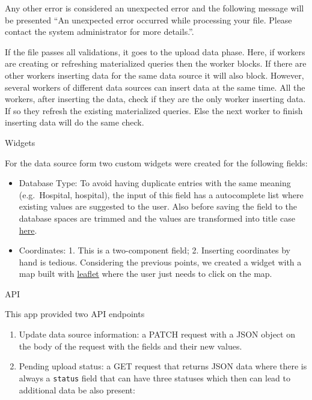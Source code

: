 \documentclass[
]{book}
\providecommand{\tightlist}{%
  \setlength{\itemsep}{0pt}\setlength{\parskip}{0pt}}
\begin{document}
Any other error is considered an unexpected error and the following message will be presented ``An unexpected error occurred while processing your file. Please contact the system administrator for more details.''.

If the file passes all validations, it goes to the upload data phase.
Here, if workers are creating or refreshing materialized queries then the worker blocks.
If there are other workers inserting data for the same data source it will also block.
However, several workers of different data sources can insert data at the same time.
All the workers, after inserting the data, check if they are the only worker inserting data. If so they refresh the existing materialized queries.
Else the next worker to finish inserting data will do the same check.

Widgets

For the data source form two custom widgets were created for the following fields:

\begin{itemize}
\tightlist
\item
  Database Type: To avoid having duplicate entries with the same meaning (e.g.~Hospital, hospital), the input of this field has a autocomplete list where existing values are suggested to the user.
  Also before saving the field to the database spaces are trimmed and the values are transformed into title case \href{https://github.com/EHDEN/NetworkDashboards/blob/master/dashboard_viewer/uploader/forms.py\#L25}{here}.
\item
  Coordinates: 1. This is a two-component field; 2. Inserting coordinates by hand is tedious. Considering the previous points, we created a widget with a map built with \href{https://leafletjs.com/}{leaflet} where the user just needs to click on the map.
\end{itemize}

API

This app provided two API endpoints

\begin{enumerate}
\def\labelenumi{\arabic{enumi}.}
\item
  Update data source information: a PATCH request with a JSON object on the body of the request with the fields and their new values.
\item
  Pending upload status: a GET request that returns JSON data where there is always a \texttt{status} field that can have three statuses which then can lead to additional data be also present:
\end{enumerate}
\end{document}
